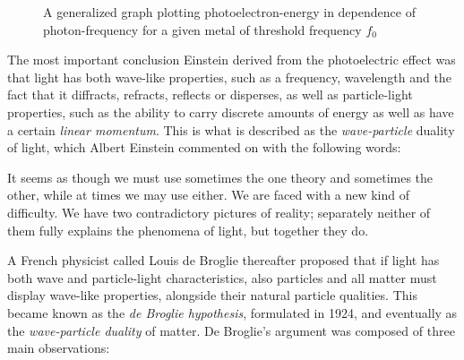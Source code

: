 \begin{figure}[h!]
	\centering
	\caption*{A generalized graph plotting photoelectron-energy in dependence of photon-frequency for a given metal of threshold frequency $f_0$}
\end{figure}

\pagebreak


The most important conclusion Einstein derived from the photoelectric effect was that light has both wave-like properties, such as a frequency, wavelength and the fact that it diffracts, refracts, reflects or disperses, as well as particle-light properties, such as the ability to carry discrete amounts of energy as well as have a certain \emph{linear momentum}. This is what is described as the \emph{wave-particle} duality of light, which Albert Einstein commented on with the following words:

\begin{displayquote}

	It seems as though we must use sometimes the one theory and sometimes the other, while at times we may use either. We are faced with a new kind of difficulty. We have two contradictory pictures of reality; separately neither of them fully explains the phenomena of light, but together they do.

\end{displayquote}


A French physicist called Louis de Broglie thereafter proposed that if light has both wave and particle-light characteristics, also particles and all matter must display wave-like properties, alongside their natural particle qualities. This became known as the \emph{de Broglie hypothesis}, formulated in 1924, and eventually as the \emph{wave-particle duality} of matter. De Broglie's argument was composed of three main observations:

